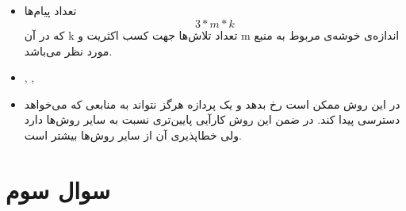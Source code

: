 \documentclass[paper=a4, fontsize=11pt]{article}
\numberwithin{equation}{section} %
\numberwithin{figure}{section} %
\numberwithin{table}{section} %
\begin{document}
\subsection{}
\begin{itemize}
    \item تعداد پیام‌ها
    \[
    3 * m * k
    \]
    که در آن k تعداد تلاش‌ها جهت کسب اکثریت و m اندازه‌ی خوشه‌ی مربوط به منبع مورد نظر می‌باشد.
    \item {}, , 
    \item
    در این روش ممکن است  رخ بدهد
    و یک پردازه هرگز نتواند به منابعی که می‌خواهد دسترسی پیدا کند.
    در ضمن این روش کارآیی پایین‌تری نسبت به سایر روش‌ها دارد ولی خطاپذیری آن از سایر روش‌ها بیشتر است.
\end{itemize}

\section{سوال سوم}
\end{document}
